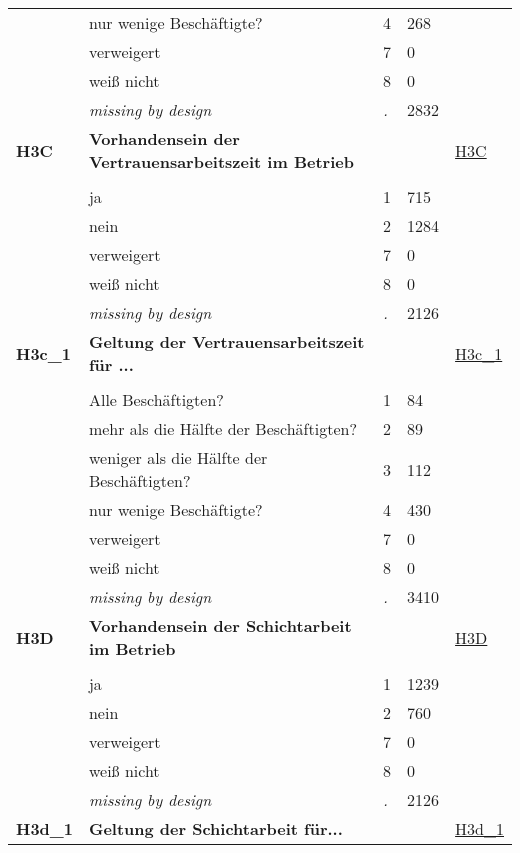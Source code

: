 \begin{longtable}{| L{2.65cm} | L{8cm} | C{1.5cm} | R{1.25cm} | C{2.25cm}  |}
   & nur wenige Beschäftigte? & 4 & 268 &  \\ 
   & verweigert & 7 & 0 &  \\ 
   & weiß nicht & 8 & 0 &  \\ 
   & \textit{missing by design} & \textit{.} & 2832 &  \\ 
   \midrule
\textbf{H3C}\label{var:H3C} & \textbf{Vorhandensein der Vertrauensarbeitszeit im Betrieb} &  &  & \hyperref[H3C]{H3C} \\ 
   &  &  &  &  \\ 
   & ja & 1 & 715 &  \\ 
   & nein & 2 & 1284 &  \\ 
   & verweigert & 7 & 0 &  \\ 
   & weiß nicht & 8 & 0 &  \\ 
   & \textit{missing by design} & \textit{.} & 2126 &  \\ 
   \midrule
\textbf{H3c\_1}\label{var:H3c:1} & \textbf{Geltung der Vertrauensarbeitszeit für ...} &  &  & \hyperref[H3c:1]{H3c\_1} \\ 
   &  &  &  &  \\ 
   & Alle Beschäftigten? & 1 & 84 &  \\ 
   & mehr als die Hälfte der Beschäftigten? & 2 & 89 &  \\ 
   & weniger als die Hälfte der Beschäftigten? & 3 & 112 &  \\ 
   & nur wenige Beschäftigte? & 4 & 430 &  \\ 
   & verweigert & 7 & 0 &  \\ 
   & weiß nicht & 8 & 0 &  \\ 
   & \textit{missing by design} & \textit{.} & 3410 &  \\ 
   \midrule
\textbf{H3D}\label{var:H3D} & \textbf{Vorhandensein der Schichtarbeit im Betrieb} &  &  & \hyperref[H3D]{H3D} \\ 
   &  &  &  &  \\ 
   & ja & 1 & 1239 &  \\ 
   & nein & 2 & 760 &  \\ 
   & verweigert & 7 & 0 &  \\ 
   & weiß nicht & 8 & 0 &  \\ 
   & \textit{missing by design} & \textit{.} & 2126 &  \\ 
   \midrule
\textbf{H3d\_1}\label{var:H3d:1} & \textbf{Geltung der Schichtarbeit für...} &  &  & \hyperref[H3d:1]{H3d\_1} \\ 

\end{longtable}
